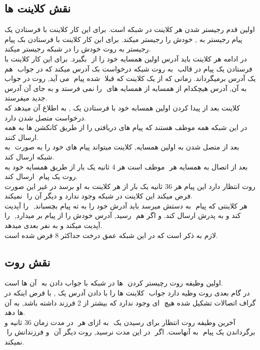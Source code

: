 \documentclass{article}
\begin{document}
	\subsection{نقش کلاینت ها}
اولین قدم رجیستر شدن هر کلاینت در شبکه است. برای این کار کلاینت با فرستادن یک پیام رجیستر به ‌, خودش را رجیستر میکند. برای این کار کلاینت با فرستادن بک پیام رجیستر به روت خودش را در شبکه رجیستر میکند.\\
در ادامه هر کلاینت باید آدرس اولین همسایه خود را از ‌ بگیرد. برای این کار کلاینت با فرستادن یک پیام در قالب ‌ به روت شبکه درخواست بک آدرس میکند که در جواب ‌ هم یک آدرس برمیگرداند. زمانی که از یک کلاینت که قبلا ‌ شده پیام ‌ می آید, روت در جواب به آن, آدرس هیچکدام از همسایه از همسایه های ‌ را نمی فرستد و به جای آن آدرس جدید میفرستد.\\
کلاینت بعد از پیدا کردن اولین همسابه خود با فرستادن یک ‌, به اطلاع آن میدهد که درخواست متصل شدن دارد.\\
در این شبکه همه موظف هستند که پیام های دریافتی را از طریق کانکشن ها به همه ارسال کنند.\\
بعد از متصل شدن به اولین همسایه, کلاینت میتواند پیام های خود را به صورت ‌ به شبکه ارسال کند.\\
بعد از اتصال به همسایه هر ‌ موظف است هر 4 ثانیه یک بار از طریق همسایه خود به روت یک پیام ‌ ارسال کند.\\
روت انتظار دارد این پیام هر 36 ثانیه یک بار از هر کلاینت به او برسد در غیر این صورت فرض میکند این کلاینت در شبکه وجود ندارد و دیگر آن را ‌ نمیکند.\\
هر کلاینتی که پیام ‌ به دستش میرسد باید آدرش خود را به ته پیام بچسباند, ‌ را آپدیت کند و به پدرش ارسال کند. و اگر هم ‌ رسید, آدرس خودش را از پیام بر میدارد, ‌ را آپدیت میکند و به نفر بعدی میدهد.\\
لازم به ذکر است که در این شبکه عمق درخت حداکثر 8 فرض شده است.\\
	\subsection{نقش روت}
اولین وظیفه روت رچیستر کردن ‌ ها در شبکه با جواب دادن به ‌ آن ها است.\\
در گام بعدی روت وظیه دارد جواب ‌ کلاینت ها را با دادن آدرس یک ‌, با فرض اینکه در گراف اتصالات تشکیل شده هیچ ‌ ای وجود ندارد که بیشتر از 2 فرزند داشته باشد, به آن ها دهد.\\
آخرین وطیفه روت انتظار برای رسیدن یک ‌ به ازای هر ‌ در مدت زمان 36 ثانیه و برگرداندن یک پیام ‌ به آنهاست. اگر ‌ در این مدت نرسید, روت دیگر آن ‌ و فرزندانش را ‌ نمیکند.
\end{document}
